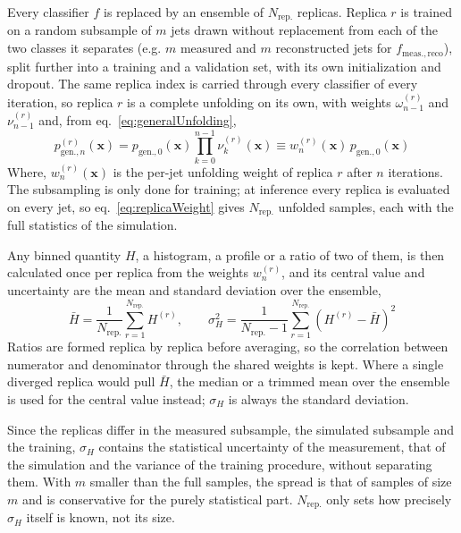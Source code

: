 Every classifier \(f\) is replaced by an ensemble of \(N_\mathrm{rep.}\) replicas. 
%
Replica \(r\) is trained on a random subsample of \(m\) jets drawn without replacement from each of the two classes it separates (e.g. \(m\) measured and \(m\) reconstructed jets for \(f_\mathrm{meas., reco}\)), split further into a training and a validation set, with its own initialization and dropout. 
%
The same replica index is carried through every classifier of every iteration, so replica \(r\) is a complete unfolding on its own, with weights \(\omega^{(r)}_{n-1}\) and \(\nu^{(r)}_{n-1}\) and, from eq.~\ref{eq:generalUnfolding},
\begin{equation}
	\label{eq:replicaWeight}
	p^{(r)}_{\mathrm{gen.}, n}(\mathbf{x}) = p_{\mathrm{gen.}, 0}(\mathbf{x})\prod_{k=0}^{n-1}\nu^{(r)}_k(\mathbf{x}) \equiv w^{(r)}_n(\mathbf{x})\,p_{\mathrm{gen.}, 0}(\mathbf{x})
\end{equation}
Where, \(w^{(r)}_n(\mathbf{x})\) is the per-jet unfolding weight of replica \(r\) after \(n\) iterations. 
%
The subsampling is only done for training; at inference every replica is evaluated on every jet, so eq.~\ref{eq:replicaWeight} gives \(N_\mathrm{rep.}\) unfolded samples, each with the full statistics of the simulation. 

Any binned quantity \(H\), a histogram, a profile or a ratio of two of them, is then calculated once per replica from the weights \(w^{(r)}_n\), and its central value and uncertainty are the mean and standard deviation over the ensemble,
\begin{equation}
	\label{eq:bootstrapUnc}
	\bar{H} = \frac{1}{N_\mathrm{rep.}}\sum_{r=1}^{N_\mathrm{rep.}} H^{(r)} , \qquad
	\sigma_H^2 = \frac{1}{N_\mathrm{rep.} - 1}\sum_{r=1}^{N_\mathrm{rep.}}\left(H^{(r)} - \bar{H}\right)^2 
\end{equation}
Ratios are formed replica by replica before averaging, so the correlation between numerator and denominator through the shared weights is kept. 
%
Where a single diverged replica would pull \(\bar{H}\), the median or a trimmed mean over the ensemble is used for the central value instead; \(\sigma_H\) is always the standard deviation. 

Since the replicas differ in the measured subsample, the simulated subsample and the training, \(\sigma_H\) contains the statistical uncertainty of the measurement, that of the simulation and the variance of the training procedure, without separating them. 
%
With \(m\) smaller than the full samples, the spread is that of samples of size \(m\) and is conservative for the purely statistical part. 
%
\(N_\mathrm{rep.}\) only sets how precisely \(\sigma_H\) itself is known, not its size. 


